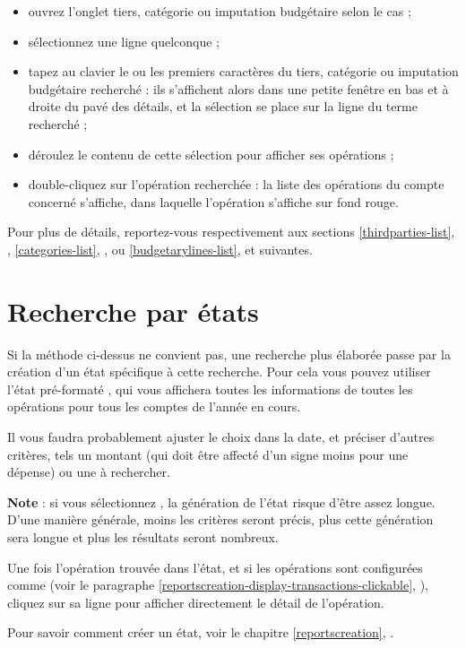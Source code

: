 \begin{itemize}
	 \item ouvrez l'onglet tiers, catégorie ou imputation budgétaire selon le cas ;
	 \item sélectionnez une ligne quelconque ;
	 \item tapez au clavier le ou les premiers caractères du tiers, catégorie ou imputation budgétaire recherché : ils s'affichent alors dans une petite fenêtre en bas et à droite du pavé des détails, et la sélection se place sur la ligne du terme recherché ;
	 \item déroulez le contenu de cette sélection pour afficher ses opérations ;
	 \item double-cliquez sur l'opération recherchée : la liste des opérations du compte concerné s'affiche, dans laquelle l'opération s'affiche sur fond rouge{\couleur}.	 	 	 
\end{itemize}


Pour plus de détails, reportez-vous respectivement aux sections \vref{thirdparties-list}, , \vref{categories-list}, , ou \vref{budgetarylines-list},  et suivantes.


\section{Recherche par états\label{search-advanced} }


Si la méthode ci-dessus ne convient pas, une recherche plus élaborée passe par la création d'un état spécifique à cette recherche. Pour cela vous pouvez utiliser l'état pré-formaté , qui vous affichera toutes les informations de toutes les opérations pour tous les comptes de  l'année en cours.

Il vous faudra probablement ajuster le choix dans la date, et préciser d'autres critères, tels un montant (qui doit être affecté d'un signe \og moins \fg{} pour une dépense) ou une  à rechercher. 

\textbf{Note} : si vous sélectionnez , la génération de l'état risque d'être assez longue. D'une manière générale, moins les critères seront précis, plus cette génération sera longue et plus les résultats seront nombreux.

Une fois l'opération trouvée dans l'état, et si les opérations sont configurées comme  (voir le paragraphe \vref{reportscreation-display-transactions-clickable}, ), cliquez sur sa ligne pour afficher directement le détail de l'opération.

Pour savoir comment créer un état, voir le chapitre \vref{reportscreation}, .


